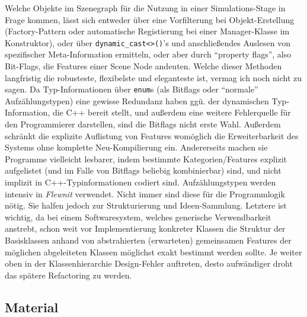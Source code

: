 	Welche Objekte im Szenegraph für die Nutzung in einer Simulations-Stage in Frage kommen, lässt sich entweder
	über eine Vorfilterung bei Objekt-Erstellung (Factory-Pattern oder automatische Registierung bei einer 
	Manager-Klasse im Konstruktor), oder über \lstinline|dynamic_cast<>()|'s und anschließendes Auslesen von spezifischer
	Meta-Information ermitteln, oder aber durch "`property flags"', also Bit-Flags, die Features einer Scene Node andeuten.
	Welche dieser Methoden langfristig die robusteste, flexibelste und eleganteste ist,
	vermag ich noch nicht zu sagen. Da Typ-Informationen über \lstinline|enum|s 
	(als Bitflags oder "`normale"' Aufzählungstypen)
	eine gewisse Redundanz haben ggü. der dynamischen Typ-Information, die C++ bereit stellt, und außerdem eine weitere
	Fehlerquelle für den Programmierer darstellen, sind die Bitflags nicht erste Wahl. Außerdem schränkt die explizite 
	Auflistung von Features womöglich die Erweiterbarkeit des Systems ohne komplette Neu-Kompilierung ein.
	Andererseits machen sie Programme vielleicht lesbarer, indem bestimmte Kategorien/Features explizit aufgelistet 
	(und im Falle von Bitflags beliebig kombinierbar) sind, 
	und nicht implizit in C++-Typinformationen codiert sind.
	Aufzählungstypen werden intensiv in \emph{Flewnit} verwendet. Nicht immer sind diese für die Programmlogik nötig.
	Sie halfen jedoch zur Strukturierung und Ideen-Sammlung. Letztere ist wichtig, da bei einem Softwaresystem,
	welches generische Verwendbarkeit anstrebt, schon weit vor Implementierung konkreter Klassen die Struktur der
	Basisklassen anhand von abstrahierten (erwarteten) gemeinsamen Features der möglichen abgeleiteten Klassen
	möglichst exakt bestimmt werden sollte. Je weiter oben in der Klassenhierarchie Design-Fehler auftreten, desto
	aufwändiger droht das spätere Refactoring zu werden.

  
 
\subsection{Material}  

